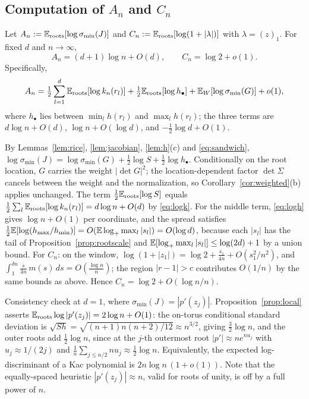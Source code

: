 \subsection{Computation of $A_n$ and $C_n$}

\begin{proposition}\label{prop:local}
  Let $A_n := \mathbb{E}_{\mathrm{roots}}[\log\sigma_{\min}(J)]$ and $C_n := \mathbb{E}_{\mathrm{roots}}[\log(1+|\lambda|)]$ with
  $\lambda=(z)_1$. For fixed $d$ and $n\to\infty$,
  \[
    A_n = (d+1)\log n + O(d), \qquad C_n = \log2 + o(1).
  \]
  Specifically,
  \[
    A_n = \tfrac12\sum_{l=1}^d\mathbb{E}_{\mathrm{roots}}[\log k_n(r_l)] + \tfrac12\mathbb{E}_{\mathrm{roots}}[\log h_\bullet]
    + \mathbb{E}_{W}[\log\sigma_{\min}(G)] + o(1),
  \]
  where $h_\bullet$ lies between $\min_lh(r_l)$ and $\max_lh(r_l)$; the three terms are
  $d\log n+O(d)$, $\log n+O(\log d)$, and $-\frac12\log d+O(1)$.
\end{proposition}

\proof
By Lemmas~\ref{lem:rice}, \ref{lem:jacobian}, \ref{lem:h}(c) and \eqref{eq:sandwich},
$\log\sigma_{\min}(J) = \log\sigma_{\min}(G) + \frac12\log S + \frac12\log h_\bullet$.
Conditionally on the root location, $G$ carries the weight $|\det G|^2$; the
location-dependent factor $\det\Sigma$ cancels between the weight and the normalization, so
Corollary~\ref{cor:weighted}(b) applies unchanged. The term $\frac12\mathbb{E}_{\mathrm{roots}}[\log S]$ equals
$\frac12\sum_l\mathbb{E}_{\mathrm{roots}}[\log k_n(r_l)] = d\log n + O(d)$ by \eqref{eq:logk}. For the middle
term, \eqref{eq:logh} gives $\log n + O(1)$ per coordinate, and the spread satisfies
$\frac12\mathbb{E}[\log(h_{\max}/h_{\min})] = O(\mathbb{E}\log_+\max_l|s_l|) = O(\log d)$, because each
$|s_l|$ has the tail of Proposition~\ref{prop:rootscale} and
$\mathbb{E}[\log_+\max_l|s_l|]\le\log(2d)+1$ by a union bound. For $C_n$: on the window,
$\log(1+|z_1|) = \log2 + \frac{s_1}{4n} + O(s_1^2/n^2)$, and
$\int_1^{\delta n}\frac s{4n}\,m(s)\,ds = O(\frac{\log n}n)$; the region $|r-1|>c$
contributes $O(1/n)$ by the same bounds as above. Hence $C_n = \log2 + O(\log n/n)$.
\endproof

\begin{remark}\label{rem:d1check}
  Consistency check at $d=1$, where $\sigma_{\min}(J) = |p'(z_j)|$.
  Proposition~\ref{prop:local} asserts $\mathbb{E}_{\mathrm{roots}}\log|p'(z_j)| = 2\log n + O(1)$: the on-torus
  conditional standard deviation is
  $\sqrt{Sh} = \sqrt{(n+1)n(n+2)/12}\approx n^{3/2}$, giving $\frac32\log n$, and the outer
  roots add $\frac12\log n$, since at the $j$-th outermost root $|p'|\approx ne^{nu_j}$ with
  $u_j\approx1/(2j)$ and $\frac1n\sum_{j\le n/2}nu_j\approx\frac12\log n$. Equivalently, the
  expected log-discriminant of a Kac polynomial is $2n\log n\,(1+o(1))$. Note that the
  equally-spaced heuristic $|p'(z_j)|\approx n$, valid for roots of unity, is off by a full
  power of $n$.
\end{remark}

